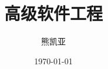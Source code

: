 \documentclass[aspectratio=169]{beamer}
\title{高级软件工程}
\author{熊凯亚}
\date{\today}
\institute[JNU]{Jinan University}
\begin{document}
\begin{frame}
\titlepage
\end{frame}
\end{document}
